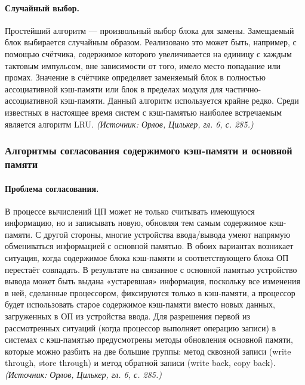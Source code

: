 \documentclass[a4paper,12pt]{article}
\begin{document}
\paragraph{Случайный выбор.}
Простейший алгоритм --- произвольный выбор блока для замены. Замещаемый блок выбирается случайным образом. Реализовано это может быть, например, с помощью счётчика, содержимое которого увеличивается на единицу с каждым тактовым импульсом, вне зависимости от того, имело место попадание или промах. Значение в счётчике определяет заменяемый блок в полностью ассоциативной кэш-памяти или блок в пределах модуля для частично-ассоциативной кэш-памяти. Данный алгоритм используется крайне редко. Среди известных в настоящее время систем с кэш-памятью наиболее встречаемым является алгоритм LRU.
\textit{(Источник: Орлов, Цилькер, гл. 6, с. 285.)}

\subsubsection{Алгоритмы согласования содержимого кэш-памяти и основной памяти}

\paragraph{Проблема согласования.}
В процессе вычислений ЦП может не только считывать имеющуюся информацию, но и записывать новую, обновляя тем самым содержимое кэш-памяти. С другой стороны, многие устройства ввода/вывода умеют напрямую обмениваться информацией с основной памятью. В обоих вариантах возникает ситуация, когда содержимое блока кэш-памяти и соответствующего блока ОП перестаёт совпадать. В результате на связанное с основной памятью устройство вывода может быть выдана «устаревшая» информация, поскольку все изменения в ней, сделанные процессором, фиксируются только в кэш-памяти, а процессор будет использовать старое содержимое кэш-памяти вместо новых данных, загруженных в ОП из устройства ввода. Для разрешения первой из рассмотренных ситуаций (когда процессор выполняет операцию записи) в системах с кэш-памятью предусмотрены методы обновления основной памяти, которые можно разбить на две большие группы: метод сквозной записи (write through, store through) и метод обратной записи (write back, copy back).
\textit{(Источник: Орлов, Цилькер, гл. 6, с. 285.)}
\end{document}

